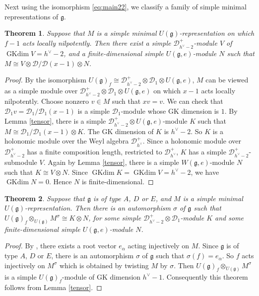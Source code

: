 \documentclass[12pt,a4paper]{amsart}
\numberwithin{equation}{section}
\newtheorem{theorem}{Theorem}[section]
\theoremstyle{definition}
\theoremstyle{remark}
\newcommand{\g}{\mathfrak g}
\newcommand{\D}{\mathcal D}
\newcommand{\Uf}{U(\g)_f}
\begin{document}
Next using the isomorphism \eqref{eq:main22},
we classify a family of simple minimal representations of
$\mathfrak g$.

\begin{theorem}Suppose that $M$ is a  simple minimal $U(\mathfrak g)$-representation on which $f-1$ acts locally nilpotently. Then there exist a simple $\D^+_{h^\vee-2}$-module $V$ of $\operatorname{GKdim} V=h^\vee-2$, and a finite-dimensional simple
$U(\g,e)$-module $N$ such that $M\cong V\otimes \D/\D (x-1)\otimes N$.
\end{theorem}

\begin{proof} By the isomorphism $\Uf\cong \D^+_{h^\vee-2}\otimes \D_1\otimes U(\g,e)$, $M$ can be viewed as a simple module over
$\D^+_{h^\vee-2}\otimes \D_1\otimes U(\g,e)$   on which $x-1$ acts locally nilpotently. Choose nonzero $v\in M$ such that $xv=v$. We can check that $\D_1 v=\D_1/\D_1(x-1)$ is a simple $\D_1$-module whose GK dimension is $1$. By Lemma \ref{tensor}, there is a simple $\D^+_{h^\vee-2}\otimes U(\g,e)$-module $K$ such that $M\cong  \D_1/\D_1(x-1)\otimes K$. The GK dimension of $K$ is $h^\vee-2$.  So
$K$ is a holonomic module over the Weyl algebra  $\D^+_{h^\vee}$. Since a holonomic module over  $\D^+_{h^\vee-2}$ has a finite composition length, restricted to $\D^+_{h^\vee}$,
$K$ has a simple $\D^+_{h^\vee-2}$-submodule $V$. Again  by Lemma \ref{tensor}, there is a simple $W(\g,e)$-module $N$ such that $K\cong V\otimes N$. Since
$\operatorname{GKdim}K=\operatorname{GKdim} V=h^\vee-2$,  we have $\operatorname{GKdim} N=0$. Hence $N$ is finite-dimensional.
\end{proof}

\begin{theorem}Suppose that $\g$ is of type $A$, $D$ or $E$, and $M$ is a  simple minimal $U(\mathfrak g)$-representation. Then
there is an automorphism $\sigma$ of $\g$ such that
$\Uf\otimes_{U(\g)} M^{\sigma}\cong K\otimes N$, for some simple $\D^+_{h^\vee-2}\otimes \D_1$-module $K$ and some finite-dimensional simple $U(\g,e)$-module $N$.
\end{theorem}

\begin{proof} By \cite[Lemma~2.4]{LZ}, there exists a root vector $e_\alpha$ acting injectively on $M$. Since $\g$ is of type $A$, $D$ or $E$, there is an automorphism $\sigma$ of $\g$ such that $\sigma(f)=e_{\alpha}$. So $f$ acts injectively on $M^\sigma$ which is obtained by twisting $M$ by $\sigma$. Then $\Uf\otimes_{U(\g)} M^{\sigma}$ is a simple
$\Uf$-module of GK dimension $h^\vee-1$. Consequently this theorem follows from Lemma \ref{tensor}.
\end{proof}
\end{document}
